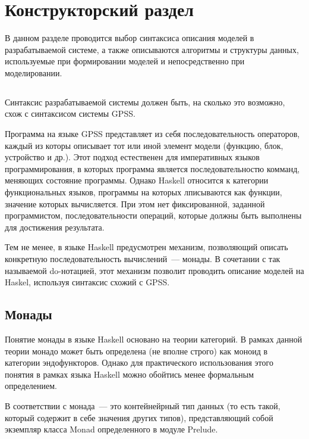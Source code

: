 \chapter{Конструкторский раздел}

В данном разделе проводится выбор синтаксиса описания моделей в разрабатываемой системе, а также описываются алгоритмы и структуры данных, используемые при формировании моделей и непосредственно при моделировании. 



\section{}

Синтаксис разрабатываемой системы должен быть, на сколько это возможно, схож с синтаксисом системы GPSS. 

Программа на языке GPSS представляет из себя последовательность операторов, каждый из которы описывает тот или иной элемент модели (функцию, блок, устройство и др.). Этот подход естественен для императивных языков программирования, в которых программа является последовательностю комманд, меняющих состояние программы. Однако Haskell относится к категории функциональных языков, программы на которых лписываются как функции, значение которых вычисляется. При этом нет фиксированной, заданной программистом, последовательности операций, которые должны быть выполнены для достижения результата. 

Тем не менее, в языке Haskell предусмотрен механизм, позволяющий описать конкретную последовательность вычислений~--- монады. В сочетании с так называемой do-нотацией, этот механизм позволит проводить описание моделей на Haskel, используя синтаксис схожий с GPSS.

\section{Монады}

Понятие монады в языке Haskell основано на теории категорий. В рамках данной теории монадо может быть определена (не вполне строго) как моноид в категории эндофункторов. Однако для практического использования этого понятия в рамках языка Haskell можно обойтись менее формальным определением.

В соответствии с \cite{Haskell} монада~--- это контейнейрный тип данных (то есть такой, который содержит в себе значения других типов), представляющий собой экземпляр класса Monad определенного в модуле Prelude. 

